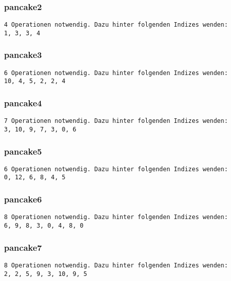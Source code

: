 \documentclass[a4paper, 10pt, ngerman]{article}
\begin{document}
\subsubsection*{pancake2}
\begin{lstlisting}[numbers=none]
4 Operationen notwendig. Dazu hinter folgenden Indizes wenden:
1, 3, 3, 4  
\end{lstlisting}

\subsubsection*{pancake3}
\begin{lstlisting}[numbers=none]
6 Operationen notwendig. Dazu hinter folgenden Indizes wenden:
10, 4, 5, 2, 2, 4 
\end{lstlisting}

\subsubsection*{pancake4}
\begin{lstlisting}[numbers=none]
7 Operationen notwendig. Dazu hinter folgenden Indizes wenden:
3, 10, 9, 7, 3, 0, 6 
\end{lstlisting}

\subsubsection*{pancake5}
\begin{lstlisting}[numbers=none]
6 Operationen notwendig. Dazu hinter folgenden Indizes wenden:
0, 12, 6, 8, 4, 5  
\end{lstlisting}

\subsubsection*{pancake6}
\begin{lstlisting}[numbers=none]
8 Operationen notwendig. Dazu hinter folgenden Indizes wenden:
6, 9, 8, 3, 0, 4, 8, 0
\end{lstlisting}

\subsubsection*{pancake7}
\begin{lstlisting}[numbers=none]
8 Operationen notwendig. Dazu hinter folgenden Indizes wenden:
2, 2, 5, 9, 3, 10, 9, 5
\end{lstlisting}
\end{document}
